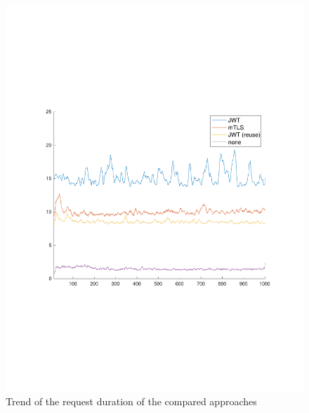 \begin{figure}
	\centering
	\includegraphics[trim=0 200 0 200, clip, width=\textwidth]{images/experiment/experiment-trend.pdf}
	\caption{Trend of the request duration of the compared approaches}
	\label{fig:trend}
\end{figure}

